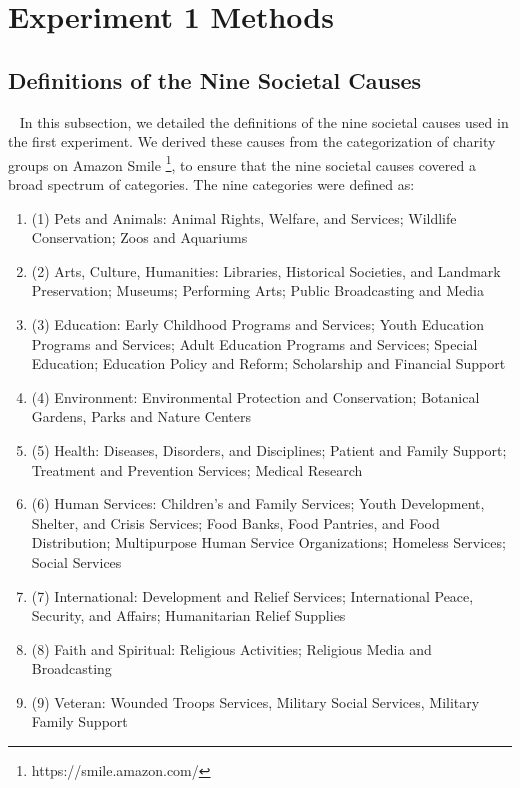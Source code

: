 \appendix

\section{Experiment 1 Methods}
\subsection{Definitions of the Nine Societal Causes}~\label{cause_def}
In this subsection, we detailed the definitions of the nine societal causes used in the first experiment. We derived these causes from the categorization of charity groups on Amazon Smile \footnote{https://smile.amazon.com/}, to ensure that the nine societal causes covered a broad spectrum of categories. The nine categories were defined as:
\begin{enumerate}[label={},leftmargin=\parindent]
    \item (1) Pets and Animals: Animal Rights, Welfare, and Services; Wildlife Conservation; Zoos and Aquariums
    \item (2) Arts, Culture, Humanities: Libraries, Historical Societies, and Landmark Preservation; Museums; Performing Arts; Public Broadcasting and Media
    \item (3) Education: Early Childhood Programs and Services; Youth Education Programs and Services; Adult Education Programs and Services; Special Education; Education Policy and Reform; Scholarship and Financial Support
    \item (4) Environment: Environmental Protection and Conservation; Botanical Gardens, Parks and Nature Centers
    \item (5) Health: Diseases, Disorders, and Disciplines; Patient and Family Support; Treatment and Prevention Services; Medical Research
    \item (6) Human Services: Children's and Family Services; Youth Development, Shelter, and Crisis Services; Food Banks, Food Pantries, and Food Distribution; Multipurpose Human Service Organizations; Homeless Services; Social Services
    \item (7) International: Development and Relief Services; International Peace, Security, and Affairs; Humanitarian Relief Supplies
    \item (8) Faith and Spiritual: Religious Activities; Religious Media and Broadcasting
    \item (9) Veteran: Wounded Troops Services, Military Social Services, Military Family Support
\end{enumerate}

